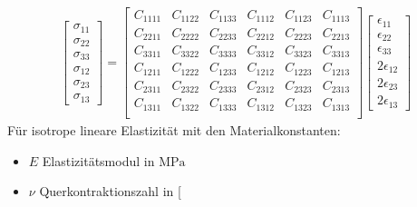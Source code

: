 \documentclass[letterpaper,10pt,german]{jupyterBook}
\begin{document}
\begin{equation}\label{equation:chapters/chapter1/elasticity:generalHook2}
\begin{split}\begin{bmatrix} 
\sigma_{11} \\
\sigma_{22} \\
\sigma_{33} \\
\sigma_{12} \\
\sigma_{23} \\
\sigma_{13} 
\end{bmatrix} = \begin{bmatrix}
C_{1111} & C_{1122} & C_{1133} & C_{1112} & C_{1123} & C_{1113} \\
C_{2211} & C_{2222} & C_{2233} & C_{2212} & C_{2223} & C_{2213} \\
C_{3311} & C_{3322} & C_{3333} & C_{3312} & C_{3323} & C_{3313} \\
C_{1211} & C_{1222} & C_{1233} & C_{1212} & C_{1223} & C_{1213} \\
C_{2311} & C_{2322} & C_{2333} & C_{2312} & C_{2323} & C_{2313} \\
C_{1311} & C_{1322} & C_{1333} & C_{1312} & C_{1323} & C_{1313} \\ 
\end{bmatrix} \begin{bmatrix} \epsilon_{11} \\ \epsilon_{22} \\ \epsilon_{33} \\ 2\epsilon_{12} \\ 2\epsilon_{23} \\ 2\epsilon_{13} \end{bmatrix}\end{split}
\end{equation}
\sphinxAtStartPar
Für isotrope lineare Elastizität mit den Materialkonstanten:
\begin{itemize}
\item {} 
\sphinxAtStartPar
\(E\) \sphinxhyphen{} Elastizitätsmodul in \(\text{MPa}\)

\item {} 
\sphinxAtStartPar
\(\nu\) \sphinxhyphen{} Querkontraktionszahl in {[}\sphinxhyphen{}{]}

\end{itemize}
\end{document}
